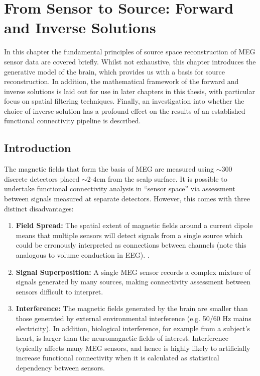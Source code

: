 \chapter{From Sensor to Source: Forward and Inverse Solutions}\label{chapter_meg_source}

In this chapter the fundamental principles of source space reconstruction of MEG sensor data are covered briefly. Whilst not exhaustive, this chapter introduces the generative model of the brain, which provides us with a basis for source reconstruction. In addition, the mathematical framework of the forward and inverse solutions is laid out for use in later chapters in this thesis, with particular focus on spatial filtering techniques. Finally, an investigation into whether the choice of inverse solution has a profound effect on the results of an established functional connectivity pipeline is described. 

\doublespacing
\section*{Introduction}
The magnetic fields that form the basis of MEG are measured using $\sim$300 discrete detectors placed  $\sim$2-4cm from the scalp surface. It is possible to undertake functional connectivity analysis in “sensor space” via assessment between signals measured at separate detectors. However, this comes with three distinct disadvantages:

\begin{enumerate}
	\item \textbf{Field Spread:} The spatial extent of magnetic fields around a current dipole means that multiple sensors will detect signals from a single source which could be erronously interpreted as connections between channels (note this analogous to volume conduction in EEG). \citep{Nunez2006,Scoffelen2009}.
	\item \textbf{Signal Superposition:} A single MEG sensor records a complex mixture of signals generated by many sources, making connectivity assessment between sensors difficult to interpret.
	\item \textbf{Interference:} The magnetic fields generated by the brain are smaller than those generated by external environmental interference (e.g. 50/60 Hz mains electricity). In addition, biological interference, for example from a subject's heart, is larger than the neuromagnetic fields of interest. Interference typically affects many MEG sensors, and hence is highly likely to artificially increase functional connectivity when it is calculated as statistical dependency between sensors. 
\end{enumerate}

